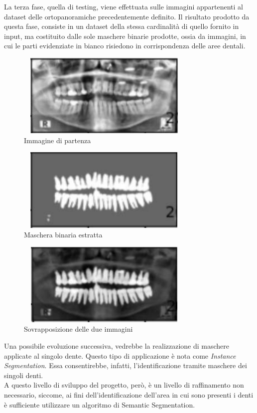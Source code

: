 \documentclass[12pt,a4paper,openright,twoside]{book}
\begin{document}
La terza fase, quella di testing, viene effettuata sulle immagini appartenenti al dataset delle ortopanoramiche precedentemente definito. Il risultato prodotto da questa fase, consiste in un dataset della stessa cardinalità di quello fornito in input, ma costituito dalle sole maschere binarie prodotte, ossia da immagini, in cui le parti evidenziate in bianco risiedono in corrispondenza delle aree dentali.
\begin{figure}[H]
    	\centering
    	\includegraphics[height=4cm,width=8.5cm]{figures/mask_img.pdf}
   	\caption{Immagine di partenza}
	\label{fig:masking}
\end{figure}
\begin{figure}[H]
    	\centering
    	\includegraphics[height=4cm,width=8.5cm]{figures/mask_mask.pdf}
    	\caption{Maschera binaria estratta}
	\label{fig:mask}
\end{figure}
\begin{figure}[H]
    	\centering
   	\includegraphics[height=4cm,width=8.5cm]{figures/mask_tot.pdf}
    	\caption{Sovrapposizione delle due immagini}
	\label{fig:masktot}
\end{figure} 

Una possibile evoluzione successiva, vedrebbe la realizzazione di maschere applicate al singolo dente. Questo tipo di applicazione è nota come {\itshape Instance Segmentation}. Essa consentirebbe, infatti, l'identificazione tramite maschere dei singoli denti.\\
A questo livello di sviluppo del progetto, però, è un livello di raffinamento non necessario, siccome, ai fini dell'identificazione dell'area in cui sono presenti i denti è sufficiente utilizzare un algoritmo di Semantic Segmentation.
\end{document}
